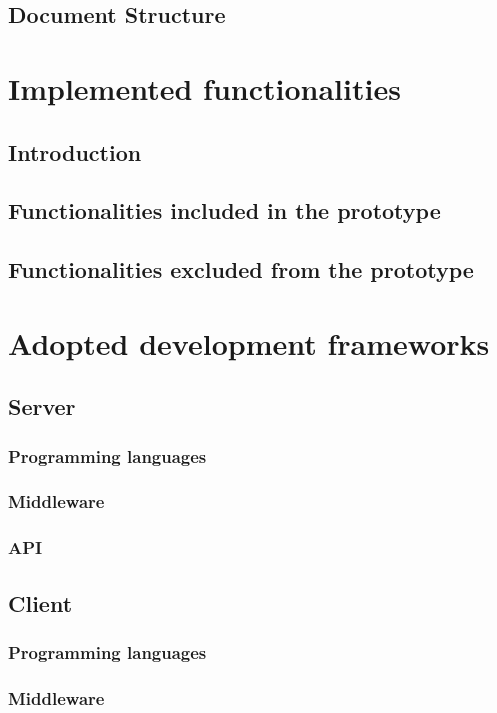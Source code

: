     \section{Document Structure}
    	
    
\newpage
\chapter{Implemented functionalities}
    \section{Introduction}
    \section{Functionalities included in the prototype}
    \section{Functionalities excluded from the prototype}
    
\newpage
\chapter{Adopted development frameworks}
    \section{Server}
        \subsection{Programming languages}
        \subsection{Middleware}
        \subsection{API}
    \section{Client}
	    \subsection{Programming languages}
	    \subsection{Middleware}
